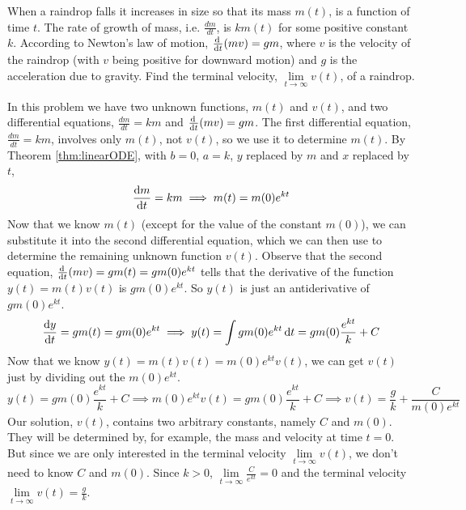 \begin{eg}\label{eg:SDEraindrop}
When a raindrop falls it increases
in size so that its mass $m(t)$, is a function of time $t$. The rate of
growth of mass, i.e. $\frac{dm}{dt}$, is $km(t)$ for some positive
constant $k$. According to Newton's law of motion, $\diff{}{t} (mv)=gm$,
where $v$ is the velocity of the raindrop (with $v$ being positive for
downward motion) and $g$ is the acceleration due to gravity. Find the
terminal velocity, $\lim\limits_{t\rightarrow\infty}v(t)$, of a raindrop.

\soln In this problem we have two unknown functions, $m(t)$ and $v(t)$,
and two differential equations, $\frac{dm}{dt}=km$ and $\diff{}{t} (mv)=gm$.
The first differential equation, $\frac{dm}{dt}=km$, involves only
$m(t)$, not $v(t)$, so we use it to determine $m(t)$.
By Theorem \ref{thm:linearODE}, with $b=0$, $a=k$, $y$ replaced
by $m$ and $x$ replaced by $t$,
\begin{equation*}
\diff{m}{t}=km
\implies m(t) = m(0) e^{kt}
\end{equation*}
Now that we know $m(t)$ (except for the value of the constant $m(0)$),
we can substitute it into the second differential
equation, which we can then use to determine the remaining unknown function
$v(t)$. Observe that the second equation, $\diff{}{t} (mv)=gm(t)=gm(0)e^{kt}$
tells that the derivative of the function $y(t)=m(t)v(t)$ is
$gm(0)e^{kt}$. So $y(t)$ is just an antiderivative of $gm(0)e^{kt}$.
\begin{equation*}
\diff{y}{t}=gm(t)=gm(0)e^{kt}
\implies y(t)=\int gm(0)e^{kt}\,\dee{t} = gm(0)\frac{e^{kt}}{k}+C
\end{equation*}
Now that we know $y(t)=m(t)v(t)=m(0)e^{kt}v(t)$, we can get $v(t)$ just by
dividing out the $m(0)e^{kt}$.
\begin{equation*}
y(t)=gm(0)\frac{e^{kt}}{k}+C\implies m(0)e^{kt}v(t)=gm(0)\frac{e^{kt}}{k}+C
\implies v(t)=\frac{g}{k}+\frac{C}{m(0)e^{kt}}
\end{equation*}
Our solution, $v(t)$, contains two arbitrary constants, namely $C$ and $m(0)$.
They will be determined by, for example, the mass and velocity at time $t=0$.
But since we are only interested in the terminal velocity
$\lim\limits_{t\rightarrow\infty}v(t)$, we don't need to know $C$ and $m(0)$.
Since $k>0$, $\lim\limits_{t\rightarrow\infty}\frac{C}{e^{kt}}=0$ and
the terminal velocity
$\lim\limits_{t\rightarrow\infty}v(t)=\frac{g}{k}$.

\end{eg}


